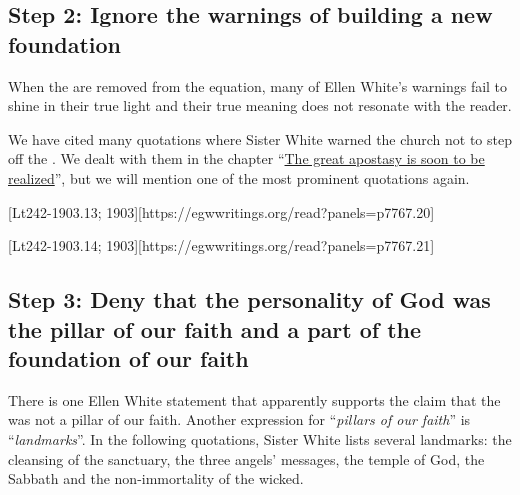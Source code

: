 \subsection*{Step 2: Ignore the warnings of building a new foundation}

When the  are removed from the equation, many of Ellen White’s warnings fail to shine in their true light and their true meaning does not resonate with the reader.

We have cited many quotations where Sister White warned the church not to step off the . We dealt with them in the chapter “\hyperref[chap:apostasy]{The great apostasy is soon to be realized}”, but we will mention one of the most prominent quotations again.

[Lt242-1903.13; 1903][https://egwwritings.org/read?panels=p7767.20]

[Lt242-1903.14; 1903][https://egwwritings.org/read?panels=p7767.21]

\subsection*{Step 3: Deny that the personality of God was the pillar of our faith and a part of the foundation of our faith}

There is one Ellen White statement that apparently supports the claim that the  was not a pillar of our faith. Another expression for “\textit{pillars of our faith}” is “\textit{landmarks}”. In the following quotations, Sister White lists several landmarks: the cleansing of the sanctuary, the three angels’ messages, the temple of God, the Sabbath and the non-immortality of the wicked.

